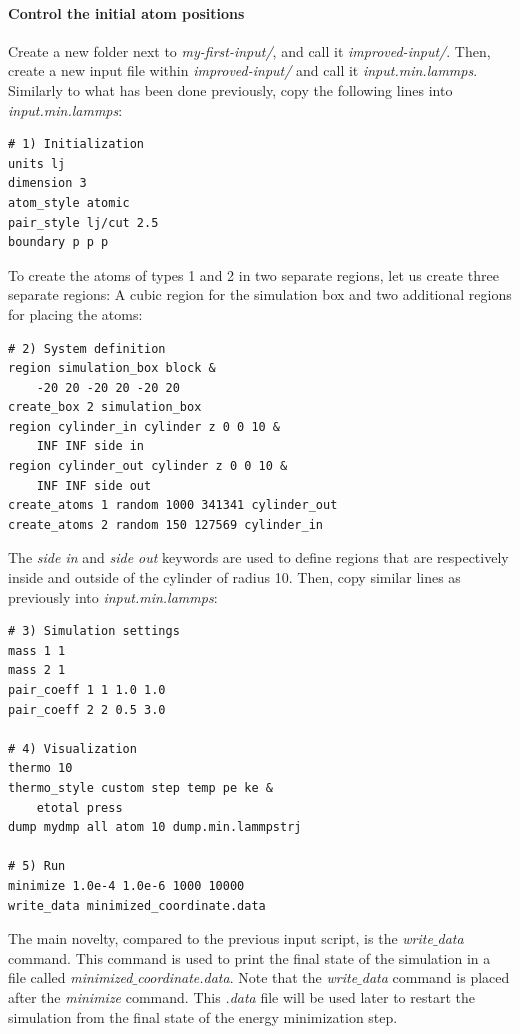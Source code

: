 \documentclass[9pt,tutorial]{livecoms}
\begin{document}
\paragraph{Control the initial atom positions}
\noindent Create a new folder next to \textit{my-first-input/}, and call it \textit{improved-input/}. Then, create a new input file within \textit{improved-input/} and call it \textit{input.min.lammps}. Similarly to what has been done previously, copy the following lines into \textit{input.min.lammps}:
{\normalsize \begin{verbatim}
# 1) Initialization
units lj
dimension 3
atom_style atomic
pair_style lj/cut 2.5
boundary p p p
\end{verbatim}}
To create the atoms of types 1 and 2 in two separate regions, let us create three separate regions: A cubic region for the simulation box and two additional regions for placing the atoms:
{\normalsize \begin{verbatim}
# 2) System definition
region simulation_box block &
    -20 20 -20 20 -20 20
create_box 2 simulation_box
region cylinder_in cylinder z 0 0 10 &
    INF INF side in
region cylinder_out cylinder z 0 0 10 &
    INF INF side out
create_atoms 1 random 1000 341341 cylinder_out
create_atoms 2 random 150 127569 cylinder_in
\end{verbatim}}
The \textit{side in} and \textit{side out} keywords are used to define regions that are respectively inside and outside of the cylinder of radius 10. Then, copy similar lines as previously into \textit{input.min.lammps}:
{\normalsize \begin{verbatim}
# 3) Simulation settings
mass 1 1
mass 2 1
pair_coeff 1 1 1.0 1.0
pair_coeff 2 2 0.5 3.0

# 4) Visualization
thermo 10
thermo_style custom step temp pe ke &
    etotal press
dump mydmp all atom 10 dump.min.lammpstrj

# 5) Run
minimize 1.0e-4 1.0e-6 1000 10000
write_data minimized_coordinate.data
\end{verbatim}}
The main novelty, compared to the previous input script, is the \textit{write$\_$data} command. This command is used to print the final state of the simulation in a file called \textit{minimized$\_$coordinate.data}. Note that the \textit{write$\_$data} command is placed after the \textit{minimize} command. This \textit{.data} file will be used later to restart the simulation from the final state of the energy minimization step.
\end{document}
